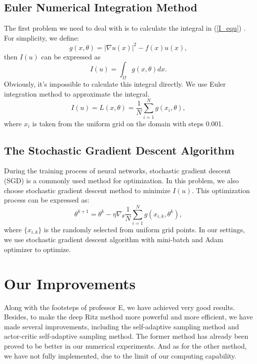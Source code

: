 \documentclass{article}
\begin{document}
\subsection{Euler Numerical Integration Method}   
\par The first problem we need to deal with is to calculate the integral in (\ref{I_equ})
 . For simplicity, we define:
 \begin{equation}
 g(x,\theta)=|\nabla u(x)|^2-f(x)u(x),
 \end{equation}
 then $I(u)$ can be expressed as
 \begin{equation}
 I(u)=\int _{\Omega}g(x,\theta)dx.
 \end{equation}
 Obviously, it's impossible to calculate this integral directly. We use Euler integration method to approximate the integral.
 \begin{equation}
 I(u)=L(x,\theta)=\frac{1}{N}\sum\limits_{i=1}^{N}g(x_i,\theta),
 \end{equation}
 where $x_i$ is taken from the uniform grid on the domain with steps 0.001.
 \subsection{The Stochastic Gradient Descent Algorithm}
 During the training process of neural networks, stochastic gradient descent (SGD) is a commonly used method for optimization. In this problem, we also choose stochastic gradient descent method to minimize $I(u)$. This optimization process can be expressed as:
 \begin{equation}
 \theta^{k+1}=\theta^{k}-\eta \nabla_{\theta}\frac{1}{N}\sum\limits_{i=1}^{N}g(x_{i,k},\theta^k),
 \end{equation}
 where $\{x_{i,k}\}$ is the randomly selected from uniform grid points. In our settings, we use stochastic gradient descent algorithm with mini-batch and Adam \cite{kingma2014adam} optimizer to optimize.

\section{Our Improvements}
\par Along with the footsteps of professor E, we have achieved very good results. Besides, to make the deep Ritz method more powerful and more efficient, we have made several improvements, including the self-adaptive sampling method and actor-critic self-adaptive sampling method. The former method has already been proved to be better in our numerical experiments. And as for the other method, we have not fully implemented, due to the limit of our computing capability.
\end{document}
